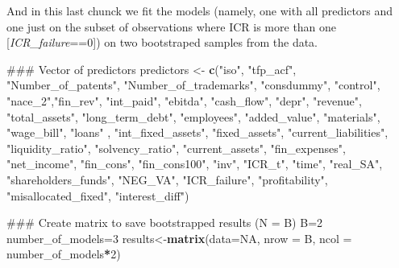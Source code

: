 \documentclass[]{article}
\newenvironment{Shaded}{\begin{snugshade}}{\end{snugshade}}
\newcommand{\DataTypeTok}[1]{\textcolor[rgb]{0.13,0.29,0.53}{#1}}
\newcommand{\DecValTok}[1]{\textcolor[rgb]{0.00,0.00,0.81}{#1}}
\newcommand{\KeywordTok}[1]{\textcolor[rgb]{0.13,0.29,0.53}{\textbf{#1}}}
\newcommand{\NormalTok}[1]{#1}
\newcommand{\OperatorTok}[1]{\textcolor[rgb]{0.81,0.36,0.00}{\textbf{#1}}}
\newcommand{\OtherTok}[1]{\textcolor[rgb]{0.56,0.35,0.01}{#1}}
\newcommand{\StringTok}[1]{\textcolor[rgb]{0.31,0.60,0.02}{#1}}
\begin{document}
And in this last chunck we fit the models (namely, one with all
predictors and one just on the subset of observations where ICR is more
than one {[}\textit{ICR\_failure}==0{]}) on two bootstraped samples from
the data.

\begin{Shaded}
\begin{Highlighting}[]
\NormalTok{### Vector of predictors}
\NormalTok{predictors <-}\StringTok{ }\KeywordTok{c}\NormalTok{(}\StringTok{"iso"}\NormalTok{, }\StringTok{"tfp_acf"}\NormalTok{,  }\StringTok{"Number_of_patents"}\NormalTok{, }\StringTok{"Number_of_trademarks"}\NormalTok{,}
                \StringTok{"consdummy"}\NormalTok{, }\StringTok{"control"}\NormalTok{, }\StringTok{"nace_2"}\NormalTok{,}\StringTok{"fin_rev"}\NormalTok{, }\StringTok{"int_paid"}\NormalTok{, }\StringTok{"ebitda"}\NormalTok{,}
                \StringTok{"cash_flow"}\NormalTok{, }\StringTok{"depr"}\NormalTok{, }\StringTok{"revenue"}\NormalTok{, }\StringTok{"total_assets"}\NormalTok{, }\StringTok{"long_term_debt"}\NormalTok{,}
                \StringTok{"employees"}\NormalTok{, }\StringTok{"added_value"}\NormalTok{, }\StringTok{"materials"}\NormalTok{, }\StringTok{"wage_bill"}\NormalTok{, }\StringTok{"loans"}\NormalTok{ ,}
                \StringTok{"int_fixed_assets"}\NormalTok{,  }\StringTok{"fixed_assets"}\NormalTok{, }\StringTok{"current_liabilities"}\NormalTok{,}
                \StringTok{"liquidity_ratio"}\NormalTok{,  }\StringTok{"solvency_ratio"}\NormalTok{, }\StringTok{"current_assets"}\NormalTok{,}
                 \StringTok{"fin_expenses"}\NormalTok{, }\StringTok{"net_income"}\NormalTok{, }\StringTok{"fin_cons"}\NormalTok{, }\StringTok{"fin_cons100"}\NormalTok{, }\StringTok{"inv"}\NormalTok{,}
                \StringTok{"ICR_t"}\NormalTok{, }\StringTok{"time"}\NormalTok{, }\StringTok{"real_SA"}\NormalTok{, }\StringTok{"shareholders_funds"}\NormalTok{, }\StringTok{"NEG_VA"}\NormalTok{,}
                \StringTok{"ICR_failure"}\NormalTok{, }\StringTok{"profitability"}\NormalTok{, }\StringTok{"misallocated_fixed"}\NormalTok{, }
                \StringTok{"interest_diff"}\NormalTok{)}

\NormalTok{### Create matrix to save bootstrapped results (N = B)}
\NormalTok{B=}\DecValTok{2}
\NormalTok{number_of_models=}\DecValTok{3}
\NormalTok{results<-}\KeywordTok{matrix}\NormalTok{(}\DataTypeTok{data=}\OtherTok{NA}\NormalTok{, }\DataTypeTok{nrow =}\NormalTok{ B, }\DataTypeTok{ncol =}\NormalTok{ number_of_models}\OperatorTok{*}\DecValTok{2}\NormalTok{)}


\end{Highlighting}
\end{Shaded}
\end{document}
